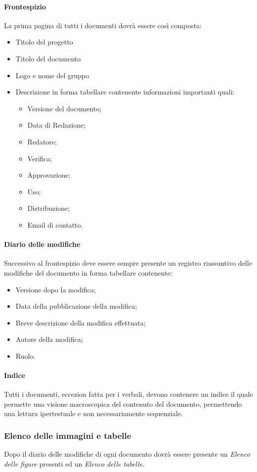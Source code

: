 \paragraph{Frontespizio}
La prima pagina di tutti i documenti dovrà essere così composta:
\begin{itemize}
	\item Titolo del progetto
	\item Titolo del documento
	\item Logo e nome del gruppo
	\item Descrizione in forma tabellare contenente informazioni importanti quali:
	\begin{itemize}
		\item Versione del documento;
		\item Data di Redazione;
		\item Redatore;
		\item Verifica;
		\item Approvazione;
		\item Uso;
		\item Distribuzione;
		\item Email di contatto.
	\end{itemize}
\end{itemize}

\paragraph{Diario delle modifiche}
Successivo al frontespizio deve essere sempre presente un registro riassuntivo delle modifiche del documento in forma tabellare contenente:
\begin{itemize}
\item Versione dopo la modifica;
\item Data della pubblicazione della modifica;
\item Breve descrizione della modifica effettuata;
\item Autore della modifica;
\item Ruolo.
\end{itemize}
\paragraph{Indice}
Tutti i documenti, eccezion fatta per i verbali, devono contenere un indice il quale permette una visione macroscopica del contenuto del documento,
permettendo una lettura ipertestuale e non necessariamente sequenziale.
 \subsubsection{Elenco delle immagini e tabelle} 
Dopo il diario delle modifiche di ogni documento dovrà essere presente un \textit{Elenco delle figure} presenti ed un \textit{Elenco delle tabelle}.

